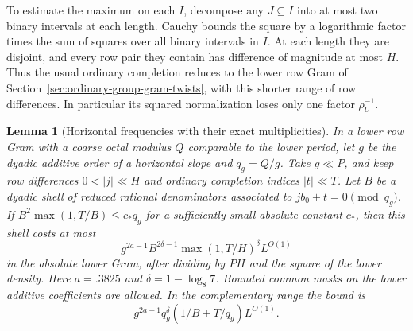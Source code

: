 \documentclass[11pt,a4paper]{article}
\theoremstyle{paperplain}
\newtheorem{lemma}[theorem]{Lemma}
\numberwithin{equation}{section}
\begin{document}
To estimate the maximum on each $I$, decompose any $J\subseteq I$ into
at most two binary intervals at each length. Cauchy bounds the square
by a logarithmic factor times the sum of squares over all binary
intervals in $I$. At each length they are disjoint, and every row
pair they contain has difference of magnitude at most $H$. Thus the
usual ordinary completion reduces to the lower row Gram of
Section~\ref{sec:ordinary-group-gram-twists}, with this shorter
range of row differences. In particular its squared normalization
loses only one factor $\rho_U^{-1}$.

\begin{lemma}[Horizontal frequencies with their exact multiplicities]
\label{octal:horizontal-weighted-offset}
In a lower row Gram with a coarse octal modulus $Q$ comparable to
the lower period, let $g$ be the dyadic additive order of a horizontal
slope and $q_g=Q/g$. Take $g\ll P$, and keep row differences
$0<|j|\ll H$ and ordinary completion indices $|t|\ll T$. Let $B$
be a dyadic shell of reduced rational denominators associated to
$j b_0+t=0\pmod{q_g}$. If $B^2\max(1,T/B)\le c_*q_g$ for a sufficiently small absolute
constant $c_*$, then this shell costs at most
\begin{equation}\label{eq:horizontal-weighted-offset}
 g^{2a-1}B^{2\delta-1}\max(1,T/H)^\delta L^{O(1)}
\end{equation}
in the absolute lower Gram, after dividing by $PH$ and the square
of the lower density. Here $a=.3825$ and $\delta=1-\log_8 7$. Bounded common masks on the lower
additive coefficients are allowed. In the complementary range the
bound is
\begin{equation}\label{eq:horizontal-weighted-overflow}
 g^{2a-1}q_g^\delta(1/B+T/q_g)L^{O(1)}.
\end{equation}
\end{lemma}
\end{document}
